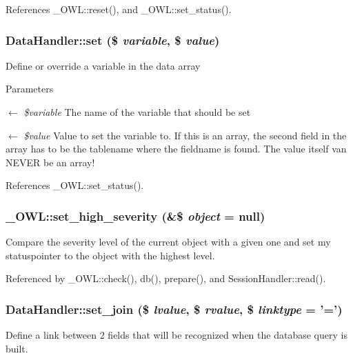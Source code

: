 References \_\-OWL::reset(), and \_\-OWL::set\_\-status().

\subsubsection[{set}]{\setlength{\rightskip}{0pt plus 5cm}DataHandler::set (\$ {\em variable}, \/  \$ {\em value})}\label{classDataHandler_a296f26f5af1e46a49ae44110848fa031}
Define or override a variable in the data array


\begin{DoxyParams}{Parameters}
\item[\mbox{$\leftarrow$} {\em \$variable}]The name of the variable that should be set \item[\mbox{$\leftarrow$} {\em \$value}]Value to set the variable to. If this is an array, the second field in the array has to be the tablename where the fieldname is found. The value itself van NEVER be an array! \end{DoxyParams}


References \_\-OWL::set\_\-status().

\subsubsection[{set\_\-high\_\-severity}]{\setlength{\rightskip}{0pt plus 5cm}\_\-OWL::set\_\-high\_\-severity (\&\$ {\em object} = {\ttfamily null})}\label{class__OWL_a576829692a3b66e3d518853bf43abae3}
Compare the severity level of the current object with a given one and set my statuspointer to the object with the highest level. 

Referenced by \_\-OWL::check(), db(), prepare(), and SessionHandler::read().

\subsubsection[{set\_\-join}]{\setlength{\rightskip}{0pt plus 5cm}DataHandler::set\_\-join (\$ {\em lvalue}, \/  \$ {\em rvalue}, \/  \$ {\em linktype} = {\ttfamily '='})}\label{classDataHandler_a9b77733f02e9d6281fc40df110c0ba70}
Define a link between 2 fields that will be recognized when the database query is built.


